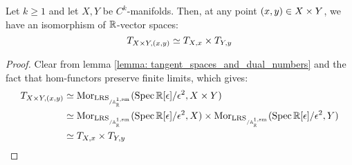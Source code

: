         \begin{corollary} \label{coro: tangent_space_of_products}
            Let $k \geq 1$ and let $X, Y$ be $C^k$-manifolds. Then, at any point $(x, y) \in X \x Y$, we have an isomorphism of $\mathbb{R}$-vector spaces:
                $$T_{X \x Y, (x, y)} \cong T_{X, x} \x T_{Y, y}$$
        \end{corollary}
            \begin{proof}
                Clear from lemma \ref{lemma: tangent_spaces_and_dual_numbers} and the fact that hom-functors preserve finite limits, which gives:
                    $$
                        \begin{aligned}
                            T_{X \x Y, (x, y)} & \cong \Mor_{\LRS_{/\A^{1, \smooth}_{\R}}}(\Spec \R[\e]/\e^2, X \x Y)
                            \\
                            & \cong \Mor_{\LRS_{/\A^{1, \smooth}_{\R}}}(\Spec \R[\e]/\e^2, X) \x \Mor_{\LRS_{/\A^{1, \smooth}_{\R}}}(\Spec \R[\e]/\e^2, Y)
                            \\
                            & \cong T_{X, x} \x T_{Y, y}
                        \end{aligned}
                    $$
            \end{proof}

